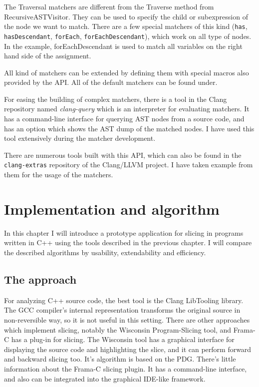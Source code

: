 \documentclass[oneside,12pt,a4paper]{book}
\begin{document}
The Traversal matchers are different from the Traverse method from RecursiveASTVisitor. They can be used to specify the child or subexpression of the node we want to match. There are a few special matchers of this kind (\texttt{has}, \texttt{hasDescendant}, \texttt{forEach}, \texttt{forEachDescendant}), which work on all type of nodes. In the example, forEachDescendant is used to match all variables on the right hand side of the assignment. 

All kind of matchers can be extended by defining them with special macros also provided by the API. All of the default matchers can be found under\cite{ASTMatchers-reference}.

For easing the building of complex matchers, there is a tool in the Clang repository named \textit{clang-query} which is an interpreter for evaluating matchers. It has a command-line interface for querying AST nodes from a source code, and has an option which shows the AST dump of the matched nodes. I have used this tool extensively during the matcher development.

There are numerous tools built with this API, which can also be found in the \texttt{clang-extras} repository of the Clang/LLVM project. I have taken example from them for the usage of the matchers.

\chapter{Implementation and algorithm}

In this chapter I will introduce a prototype application for slicing in programs written in C++ using the tools described in the previous chapter. I will compare the described algorithms by usability, extendability and efficiency. 

\section{The approach}

For analyzing C++ source code, the best tool is the Clang LibTooling library. The GCC compiler's internal representation transforms the original source in non-reversible way, so it is not useful in this setting. There are other approaches which implement slicing, notably the Wisconsin Program-Slicing tool\cite{Wisconsin-slicing-tool}, and Frama-C has a plug-in for slicing\cite{Frama-C-slicing}. The Wisconsin tool has a graphical interface for displaying the source code and highlighting the slice, and it can perform forward and backward slicing too. It's algorithm is based on the PDG. There's little information about the Frama-C slicing plugin. It has a command-line interface, and also can be integrated into the graphical IDE-like framework.
\end{document}
